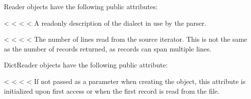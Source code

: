 \documentclass[letterpaper,10pt,english]{sphinxmanual}
\begin{document}
Reader objects have the following public attributes:

\vspace{5px}

\begin{fulllineitems}
\label{\detokenize{csv:csv.csvreader.dialect}}<%
\pysigstartsignatures
<%
<%
<%
A read\sphinxhyphen{}only description of the dialect in use by the parser.

\end{fulllineitems}


\vspace{5px}

\begin{fulllineitems}
\label{\detokenize{csv:csv.csvreader.line_num}}<%
\pysigstartsignatures
<%
<%
<%
The number of lines read from the source iterator. This is not the same as the
number of records returned, as records can span multiple lines.

\end{fulllineitems}


DictReader objects have the following public attribute:

\vspace{5px}

\begin{fulllineitems}
\label{\detokenize{csv:csv.csvreader.fieldnames}}<%
\pysigstartsignatures
<%
<%
<%
If not passed as a parameter when creating the object, this attribute is
initialized upon first access or when the first record is read from the
file.

\end{fulllineitems}
\end{document}
